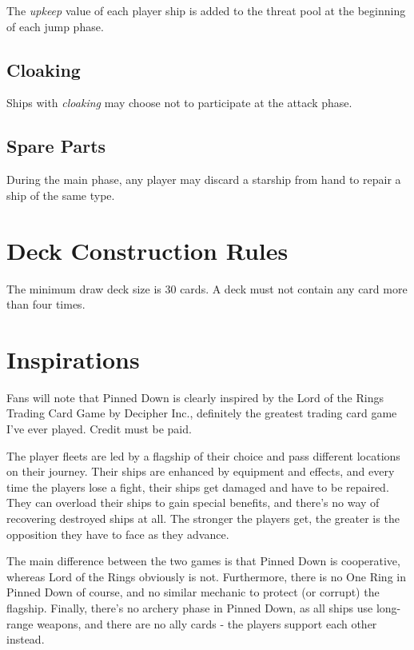 \documentclass[11pt, a4paper]{article}
\begin{document}
The \emph{upkeep} value of each player ship is added to the threat pool at the
beginning of each jump phase.

\subsection{Cloaking}

Ships with \emph{cloaking} may choose not to participate at the attack phase.

\subsection{Spare Parts}

During the main phase, any player may discard a starship from hand to repair
a ship of the same type.

\section{Deck Construction Rules}

The minimum draw deck size is 30 cards. A deck must not contain any card more
than four times.

\section{Inspirations}

Fans will note that Pinned Down is clearly inspired by the Lord of the Rings
Trading Card Game by Decipher Inc., definitely the greatest trading card game
I've ever played. Credit must be paid.

The player fleets are led by a flagship of their choice and pass different
locations on their journey. Their ships are enhanced by equipment and effects,
and every time the players lose a fight, their ships get damaged and have to be
repaired. They can overload their ships to gain special benefits, and there's no
way of recovering destroyed ships at all. The stronger the players get, the
greater is the opposition they have to face as they advance.

The main difference between the two games is that Pinned Down is cooperative,
whereas Lord of the Rings obviously is not. Furthermore, there is no One Ring
in Pinned Down of course, and no similar mechanic to protect (or corrupt) the
flagship. Finally, there's no archery phase in Pinned Down, as all ships use
long-range weapons, and there are no ally cards - the players support each
other instead.
\end{document}
